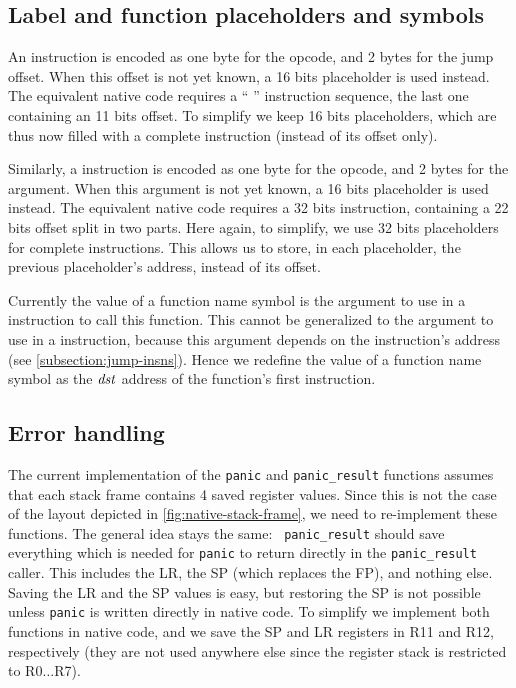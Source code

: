 \subsection{Label and function placeholders and
symbols}\label{subsection:native-placeholders}

An  instruction is encoded as one byte for the opcode, and 2 bytes
for the jump offset. When this offset is not yet known, a 16 bits placeholder
is used instead. The equivalent native code requires a `` 
'' instruction sequence, the last one containing an 11 bits offset. To
simplify we keep 16 bits placeholders, which are thus now filled with a
complete  instruction (instead of its offset only).

Similarly, a  instruction is encoded as one byte for the opcode, and
2 bytes for the argument. When this argument is not yet known, a 16 bits
placeholder is used instead. The equivalent native code requires a 32 bits
 instruction, containing a 22 bits offset split in two parts. Here
again, to simplify, we use 32 bits placeholders for complete
 instructions. This allows us to store, in each placeholder, the
previous placeholder's address, instead of its offset.

Currently the value of a function name symbol is the argument to use in a
 instruction to call this function. This cannot be generalized to
the argument to use in a  instruction, because this argument depends on
the instruction's address (see \cref{subsection:jump-insns}). Hence we redefine
the value of a function name symbol as the $\it{dst}$ address of the function's
first instruction.

\subsection{Error handling}

The current implementation of the {\tt panic} and {\tt panic\_result} functions
assumes that each stack frame contains 4 saved register values. Since this is
not the case of the layout depicted in \cref{fig:native-stack-frame}, we need
to re-implement these functions. The general idea stays the same: {\tt
panic\_result} should save everything which is needed for {\tt panic} to return
directly in the {\tt panic\_result} caller. This includes the LR, the SP (which
replaces the FP), and nothing else. Saving the LR and the SP values is easy,
but restoring the SP is not possible unless {\tt panic} is written directly in
native code. To simplify we implement both functions in native code, and we
save the SP and LR registers in R11 and R12, respectively (they are not used
anywhere else since the register stack is restricted to R0$\ldots$R7).

